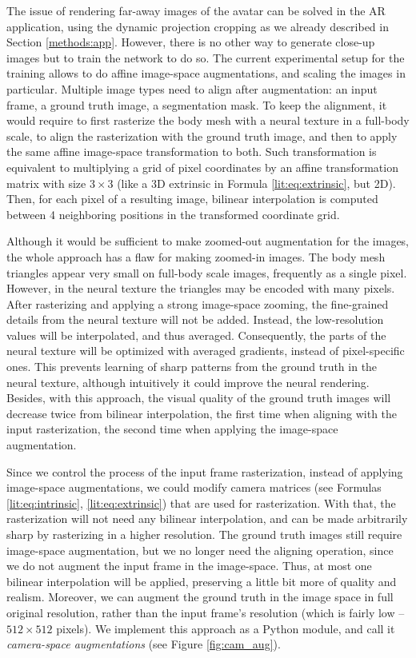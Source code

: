 The issue of rendering far-away images of the avatar can be solved in the AR application, using the dynamic projection cropping as we already described in Section \ref{methods:app}. However, there is no other way to generate close-up images but to train the network to do so. The current experimental setup for the training allows to do affine image-space augmentations, and scaling the images in particular. Multiple image types need to align after augmentation: an input frame, a ground truth image, a segmentation mask. To keep the alignment, it would require to first rasterize the body mesh with a neural texture in a full-body scale, to align the rasterization with the ground truth image, and then to apply the same affine image-space transformation to both. Such transformation is equivalent to multiplying a grid of pixel coordinates by an affine transformation matrix with size $3 \times 3$ (like a 3D extrinsic in Formula \ref{lit:eq:extrinsic}, but 2D). Then, for each pixel of a resulting image, bilinear interpolation is computed between 4 neighboring positions in the transformed coordinate grid. 

Although it would be sufficient to make zoomed-out augmentation for the images, the whole approach has a flaw for making zoomed-in images. The body mesh triangles appear very small on full-body scale images, frequently as a single pixel. However, in the neural texture the triangles may be encoded with many pixels. After rasterizing and applying a strong image-space zooming, the fine-grained details from the neural texture will not be added. Instead, the low-resolution values will be interpolated, and thus averaged. Consequently, the parts of the neural texture will be optimized with averaged gradients, instead of pixel-specific ones. This prevents learning of sharp patterns from the ground truth in the neural texture, although intuitively it could improve the neural rendering. Besides, with this approach, the visual quality of the ground truth images will decrease twice from bilinear interpolation, the first time when aligning with the input rasterization, the second time when applying the image-space augmentation.

Since we control the process of the input frame rasterization, instead of applying image-space augmentations, we could modify camera matrices (see Formulas \ref{lit:eq:intrinsic}, \ref{lit:eq:extrinsic}) that are used for rasterization. With that, the rasterization will not need any bilinear interpolation, and can be made arbitrarily sharp by rasterizing in a higher resolution. The ground truth images still require image-space augmentation, but we no longer need the aligning operation, since we do not augment the input frame in the image-space. Thus, at most one bilinear interpolation will be applied, preserving a little bit more of quality and realism. Moreover, we can augment the ground truth in the image space in full original resolution, rather than the input frame's resolution (which is fairly low -- $512 \times 512$ pixels). We implement this approach as a Python module, and call it \textit{camera-space augmentations} (see Figure \ref{fig:cam_aug}).

